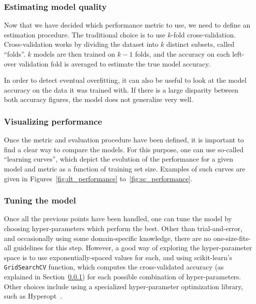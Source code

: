 \documentclass{sigkddExp}
\newcommand{\py}[1]{\texttt{#1}}
\begin{document}
\subsubsection{Estimating model quality}
\label{sec:cv}
Now that we have decided which performance metric to use, we need to define an estimation procedure.
The traditional choice is to use \(k\)-fold cross-validation.
Cross-validation works by dividing the dataset into \(k\) distinct subsets, called ``folds''.
\(k\) models are then trained on \(k-1\) folds, and the accuracy on each left-over validation fold is averaged to estimate the true model accuracy.

In order to detect eventual overfitting, it can also be useful to look at the model accuracy on the data it was trained with.
If there is a large disparity between both accuracy figures, the model does not generalize very well.

\subsubsection{Visualizing performance}
Once the metric and evaluation procedure have been defined, it is important to find a clear way to compare the models.
For this purpose, one can use so-called ``learning curves'', which depict the evolution of the performance for a given model and metric as a function of training set size.
Examples of such curves are given in Figures~\ref{fig:dt_performance} to~\ref{fig:sc_performance}.

\subsubsection{Tuning the model}
Once all the previous points have been handled, one can tune the model by choosing hyper-parameters which perform the best.
Other than trial-and-error, and occasionally using some domain-specific knowledge, there are no one-size-fits-all guidelines for this step.
However, a good way of exploring the hyper-parameter space is to use exponentially-spaced values for each, and using scikit-learn's \py{GridSearchCV} function, which computes the cross-validated accuracy (as explained in Section~\ref{sec:cv}) for each possible combination of hyper-parameters.
Other choices include using a specialized hyper-parameter optimization library, such as Hyperopt~\cite{hyperopt2013, bergstra2013hyperopt}.
\end{document}
